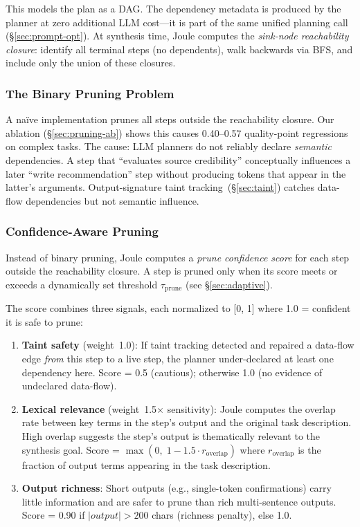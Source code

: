 \documentclass[sigconf,authordraft]{acmart}
\begin{document}
\noindent This models the plan as a DAG.
The dependency metadata is produced by the planner at zero additional LLM cost---it is part of the same unified planning call (\S\ref{sec:prompt-opt}).
At synthesis time, Joule computes the \emph{sink-node reachability closure}: identify all terminal steps (no dependents), walk backwards via BFS, and include only the union of these closures.

\subsubsection{The Binary Pruning Problem}

A na\"{i}ve implementation prunes all steps outside the reachability closure.
Our ablation (\S\ref{sec:pruning-ab}) shows this causes 0.40--0.57 quality-point regressions on complex tasks.
The cause: LLM planners do not reliably declare \emph{semantic} dependencies.
A step that ``evaluates source credibility'' conceptually influences a later ``write recommendation'' step without producing tokens that appear in the latter's arguments.
Output-signature taint tracking~(\S\ref{sec:taint}) catches data-flow dependencies but not semantic influence.

\subsubsection{Confidence-Aware Pruning}

Instead of binary pruning, Joule computes a \emph{prune confidence score} for each step outside the reachability closure.
A step is pruned only when its score meets or exceeds a dynamically set threshold $\tau_{\text{prune}}$ (see \S\ref{sec:adaptive}).

The score combines three signals, each normalized to [0, 1] where 1.0 = confident it is safe to prune:

\begin{enumerate}[leftmargin=2em,itemsep=2pt]
  \item \textbf{Taint safety} (weight~1.0): If taint tracking detected and repaired a data-flow edge \emph{from} this step to a live step, the planner under-declared at least one dependency here.
        Score = 0.5 (cautious); otherwise 1.0 (no evidence of undeclared data-flow).

  \item \textbf{Lexical relevance} (weight~1.5$\times$ sensitivity): Joule computes the overlap rate between key terms in the step's output and the original task description.
        High overlap suggests the step's output is thematically relevant to the synthesis goal.
        Score = $\max(0,\; 1 - 1.5 \cdot r_{\text{overlap}})$ where $r_{\text{overlap}}$ is the fraction of output terms appearing in the task description.

  \item \textbf{Output richness}: Short outputs (e.g., single-token confirmations) carry little information and are safer to prune than rich multi-sentence outputs.
        Score = 0.90 if $|output| > 200$ chars (richness penalty), else 1.0.
\end{enumerate}
\end{document}
